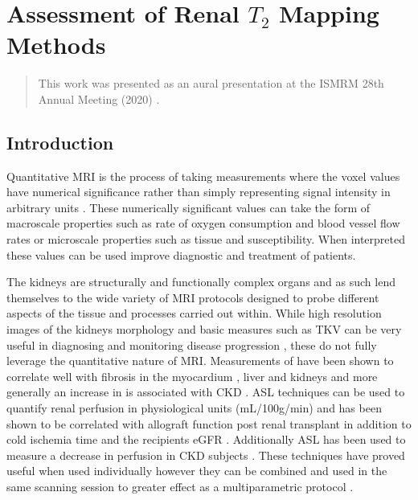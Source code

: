 \chapter{Assessment of Renal $T_2$ Mapping Methods}
\label{chap:t2_mapping}

\begin{abstract}
	This work was presented as an aural presentation at the \ac{ISMRM} 28th Annual Meeting (2020) \cite{daniel_comparison_2020}.
	
	\lipsum[1]
\end{abstract}
\newpage

\section{Introduction}
\label{sec:t2_intro}
Quantitative \ac{MRI} is the process of taking measurements where the voxel values have numerical significance rather than simply representing signal intensity in arbitrary units \cite{tofts_quantitative_2003}. These numerically significant values can take the form of macroscale properties such as rate of oxygen consumption and blood vessel flow rates or microscale properties such as tissue \tone and susceptibility. When interpreted these values can be used improve diagnostic and treatment of patients.

The kidneys are structurally and functionally complex organs and as such lend themselves to the wide variety of MRI protocols designed to probe different aspects of the tissue and processes carried out within. While high resolution images of the kidneys morphology and basic measures such as \ac{TKV} can be very useful in diagnosing and monitoring disease progression \cite{buchanan_quantitative_2019, chapman_kidney_2012, gong_relationship_2012}, these do not fully leverage the quantitative nature of \ac{MRI}. Measurements of \tone have been shown to correlate well with fibrosis in the myocardium \cite{bull_human_2013, ferreira_t1_2013}, liver \cite{hoad_study_2015, luetkens_quantification_2018} and kidneys \cite{friedli_new_2016} and more generally an increase in \tone is associated with \ac{CKD} \cite{gillis_non-contrast_2016, cox_multiparametric_2017, buchanan_quantitative_2019}. \ac{ASL} techniques can be used to quantify renal perfusion in physiological units (mL/100g/min) and has been shown to be correlated with allograft function post renal transplant in addition to cold ischemia time and the recipients \ac{eGFR} \cite{hueper_functional_2015, artz_arterial_2011, ren_evaluation_2016, niles_longitudinal_2016}. Additionally \ac{ASL} has been used to measure a decrease in perfusion in \ac{CKD} subjects \cite{gillis_non-contrast_2016, rossi_histogram_2012, tan_renal_2014}. These techniques have proved useful when used individually however they can be combined and used in the same scanning session to greater effect as a multiparametric protocol \cite{buchanan_quantitative_2019, cox_multiparametric_2017, eckerbom_multiparametric_2019, schley_multiparametric_2018, hueper_kidney_2016}.

